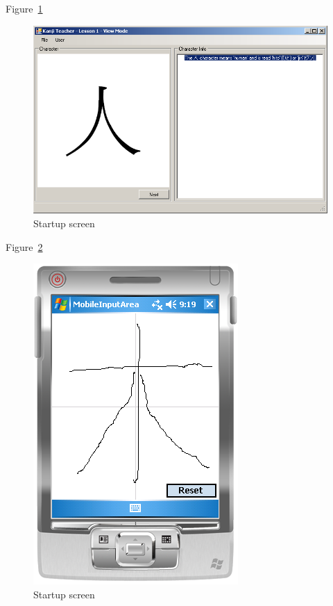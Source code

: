 Figure~\ref{fig:viewMode}
\begin{figure}[htbp]
\begin{center}
\includegraphics[scale=0.7]{images/ConceptualDesign/viewMode.png}
\caption{Startup screen}
\label{fig:viewMode}
\end{center}
\end{figure}

Figure~\ref{fig:mobileDeviceInput}
\begin{figure}[htbp]
\begin{center}
\includegraphics[scale=0.7]{images/ConceptualDesign/mobileDeviceInput.png}
\caption{Startup screen}
\label{fig:mobileDeviceInput}
\end{center}
\end{figure}






